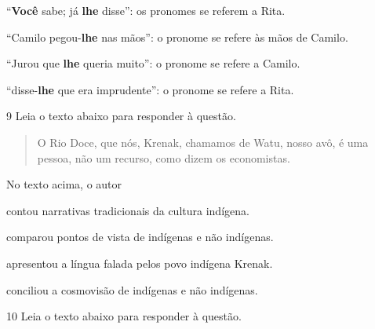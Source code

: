 \begin{escolha}

  \item ``\textbf{Você} sabe; já \textbf{lhe} disse'': os pronomes se referem a Rita.
  
  \item ``Camilo pegou-\textbf{lhe} nas mãos'': o pronome se refere às mãos de Camilo.
  
  \item ``Jurou que \textbf{lhe} queria muito'': o pronome se refere a Camilo.
  
  \item ``disse-\textbf{lhe} que era imprudente'': o pronome se refere a Rita.

\end{escolha}

\num{9} Leia o texto abaixo para responder à questão.

\begin{quote}

O Rio Doce, que nós, Krenak, chamamos de Watu, nosso avô, é uma pessoa,
não um recurso, como dizem os economistas.

\end{quote}


No texto acima, o autor

\begin{escolha}

  \item contou narrativas tradicionais da cultura indígena.

  \item comparou pontos de vista de indígenas e não indígenas.

  \item apresentou a língua falada pelos povo indígena Krenak.

  \item conciliou a cosmovisão de indígenas e não indígenas.

\end{escolha}

\num{10} Leia o texto abaixo para responder à questão.

